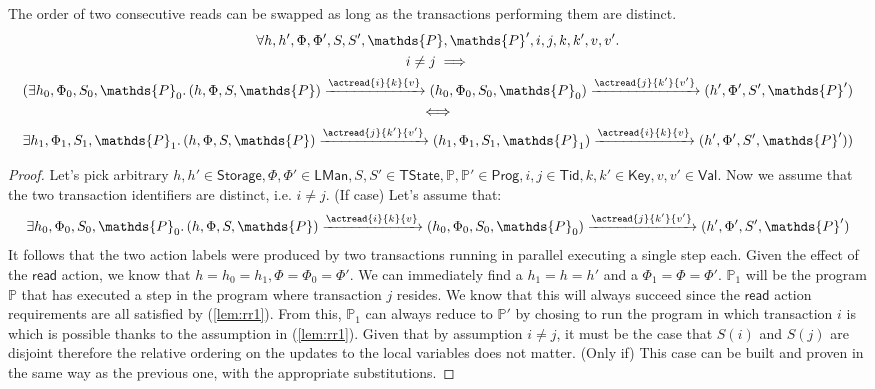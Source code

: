 \lem \label{lem:rr} The order of two consecutive reads can be swapped as long as the transactions performing them are distinct.
\begin{gather*}
	\forall h, h', \Phi, \Phi', S, S', \mathds{P}, \mathds{P}', i, j, k, k', v, v' \ldotp \\
	 i \neq j \implies
	 \\
	(\exists h_0, \Phi_0, S_0, \mathds{P}_0 \ldotp 
	(h, \Phi, S, \mathds{P}) \xrightarrow{\actread{i}{k}{v}} (h_0, \Phi_0, S_0, \mathds{P}_0)  \xrightarrow{\actread{j}{k'}{v'}} (h', \Phi', S', \mathds{P}') \\
	\iff \\
	\exists h_1, \Phi_1, S_1, \mathds{P}_1 \ldotp
	(h, \Phi, S, \mathds{P}) \xrightarrow{\actread{j}{k'}{v'}} (h_1, \Phi_1, S_1, \mathds{P}_1) \xrightarrow{\actread{i}{k}{v}} (h', \Phi', S', \mathds{P}'))
\end{gather*}
\begin{proof}
Let's pick arbitrary $h, h' \in \mathsf{Storage}, \Phi, \Phi' \in \mathsf{LMan}, S, S' \in \mathsf{TState}, \mathds{P}, \mathds{P}' \in \mathsf{Prog}, i, j \in \mathsf{Tid}, k, k' \in \mathsf{Key}, v, v' \in \mathsf{Val}$. Now we assume that the two transaction identifiers are distinct, i.e. $i \neq j$. (If case) Let's assume that:
\begin{gather} \label{lem:rr1}
	\exists h_0, \Phi_0, S_0, \mathds{P}_0 \ldotp (h, \Phi, S, \mathds{P}) \xrightarrow{\actread{i}{k}{v}} (h_0, \Phi_0, S_0, \mathds{P}_0)  \xrightarrow{\actread{j}{k'}{v'}} (h', \Phi', S', \mathds{P}')
\end{gather}
It follows that the two action labels were produced by two transactions running in parallel executing a single step each. Given the effect of the $\mathsf{read}$ action, we know that $h = h_0 = h_1, \Phi = \Phi_0 = \Phi'$. We can immediately find a $h_1 = h = h'$ and a $\Phi_1 = \Phi = \Phi'$. $\mathds{P}_1$ will be the program $\mathds{P}$ that has executed a step in the program where transaction $j$ resides. We know that this will always succeed since the $\mathsf{read}$ action requirements are all satisfied by (\ref{lem:rr1}). From this, $\mathds{P}_1$ can always reduce to $\mathds{P}'$ by chosing to run the program in which transaction $i$ is which is possible thanks to the assumption in (\ref{lem:rr1}). Given that by assumption $i \neq j$, it must be the case that $S(i)$ and $S(j)$ are disjoint therefore the relative ordering on the updates to the local variables does not matter. (Only if) This case can be built and proven in the same way as the previous one, with the appropriate substitutions.
\end{proof}

